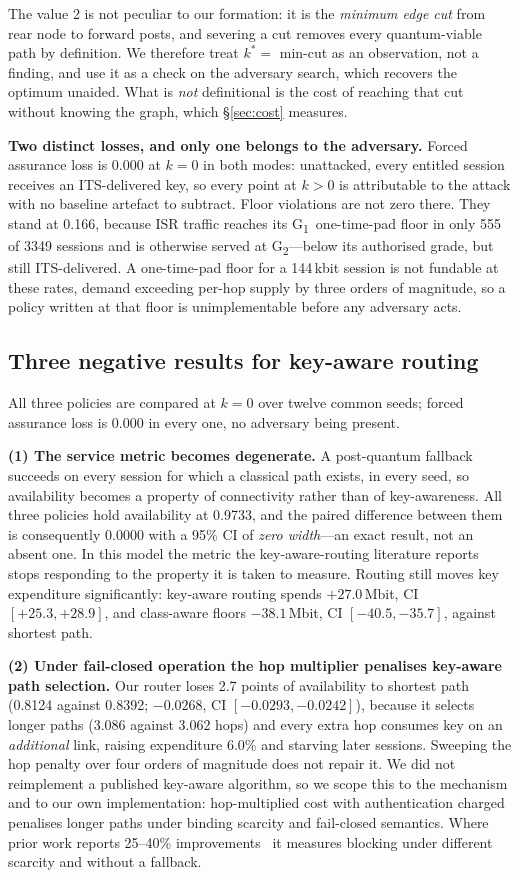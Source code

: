 \documentclass[conference]{IEEEtran}
\newcommand{\GI}{G\textsubscript{1}}
\newcommand{\GII}{G\textsubscript{2}}
\begin{document}
The value 2 is not peculiar to our formation: it is the \emph{minimum edge cut}
from rear node to forward posts, and severing a cut removes every quantum-viable
path by definition. We therefore treat $k^\ast=$ min-cut as an observation, not a
finding, and use it as a check on the adversary search, which recovers the optimum
unaided. What is \emph{not} definitional is the cost of reaching that cut without
knowing the graph, which \S\ref{sec:cost} measures.

\textbf{Two distinct losses, and only one belongs to the adversary.} Forced
assurance loss is 0.000 at $k=0$ in both modes: unattacked, every entitled session
receives an ITS-delivered key, so every point at $k>0$ is attributable to the attack
with no baseline artefact to subtract. Floor violations are not zero there. They
stand at 0.166, because ISR traffic reaches its \GI\ one-time-pad floor in only 555
of 3349 sessions and is otherwise served at \GII---below its authorised grade, but
still ITS-delivered. A one-time-pad floor for a 144\,kbit session is not fundable at
these rates, demand exceeding per-hop supply by three orders of magnitude, so a
policy written at that floor is unimplementable before any adversary acts.

\subsection{Three negative results for key-aware routing}\label{sec:routing}
All three policies are compared at $k=0$ over twelve common seeds; forced assurance
loss is 0.000 in every one, no adversary being present.

\textbf{(1) The service metric becomes degenerate.} A post-quantum fallback
succeeds on every session for which a classical path exists, in every seed, so
availability becomes a property of connectivity rather than of key-awareness. All
three policies hold availability at 0.9733, and the paired difference between them is
consequently $0.0000$ with a 95\% CI of \emph{zero width}---an exact result, not an
absent one. In this model the metric the
key-aware-routing literature reports stops responding to the property it is taken
to measure. Routing still moves key expenditure significantly: key-aware routing
spends $+27.0$\,Mbit, CI $[+25.3,+28.9]$, and class-aware floors $-38.1$\,Mbit, CI
$[-40.5,-35.7]$, against shortest path.

\textbf{(2) Under fail-closed operation the hop multiplier penalises key-aware
path selection.} Our router loses 2.7 points of availability to shortest path
(0.8124 against 0.8392; $-0.0268$, CI $[-0.0293,-0.0242]$), because it selects longer paths
(3.086 against 3.062 hops) and every extra hop consumes key on an \emph{additional}
link, raising expenditure 6.0\% and starving later sessions. Sweeping the hop
penalty over four orders of magnitude does not repair it. We did not reimplement a
published key-aware algorithm, so we scope this to the mechanism and to our own
implementation: hop-multiplied cost with authentication charged penalises longer
paths under binding scarcity and fail-closed semantics. Where prior work reports
25--40\% improvements~\cite{cvitic} it measures blocking under different scarcity
and without a fallback.
\end{document}
